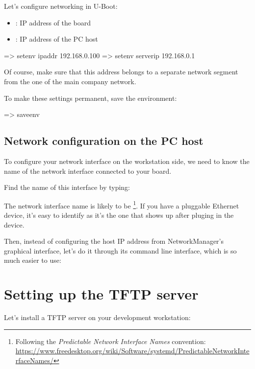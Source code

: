 Let's configure networking in U-Boot:

\begin{itemize}
  \item {}: IP address of the board
  \item {}: IP address of the PC host
\end{itemize}

\begin{ubootinput}
=> setenv ipaddr 192.168.0.100
=> setenv serverip 192.168.0.1
\end{ubootinput}

Of course, make sure that this address belongs to a separate network
segment from the one of the main company network.

To make these settings permanent, save the environment:

\begin{ubootinput}
=> saveenv
\end{ubootinput}

\subsection{Network configuration on the PC host}

To configure your network interface on the workstation side, we need
to know the name of the network interface connected to your board.

Find the name of this interface by typing:

The network interface name is likely to be
\footnote{Following the {\em Predictable Network Interface
Names} convention:
\url{https://www.freedesktop.org/wiki/Software/systemd/PredictableNetworkInterfaceNames/}}.
If you have a pluggable Ethernet device, it's easy to identify as it's
the one that shows up after pluging in the device.

Then, instead of configuring the host IP address from NetworkManager's
graphical interface, let's do it through its command line interface,
which is so much easier to use:


\section{Setting up the TFTP server}

Let's install a TFTP server on your development workstation:

